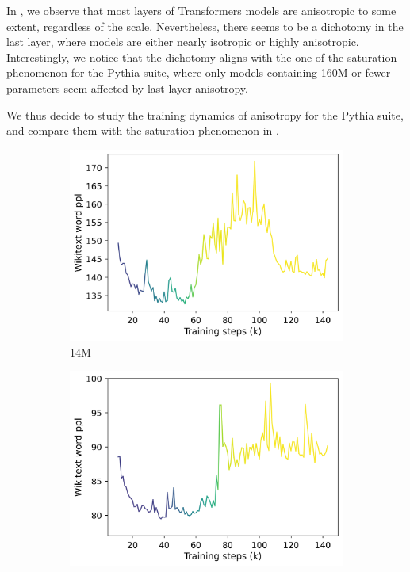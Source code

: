In , we observe that most layers of Transformers models are anisotropic to some extent, regardless of the scale. Nevertheless, there seems to be a dichotomy in the last layer, where models are either nearly isotropic or highly anisotropic. Interestingly, we notice that the dichotomy aligns with the one of the saturation phenomenon for the Pythia suite, where only models containing 160M or fewer parameters seem affected by last-layer anisotropy.

We thus decide to study the training dynamics of anisotropy for the Pythia suite, and compare them with the saturation phenomenon in .

\begin{figure}[h]
    \centering
    \begin{subfigure}{0.32\columnwidth}
         \includegraphics[width=\linewidth]{sources/part_1/softmax_bottleneck/imgs/anisotropy_explosion_14m.png}
         \caption{14M}
         \label{fig:14M}
    \end{subfigure}
    \begin{subfigure}{0.32\columnwidth}
         \includegraphics[width=\linewidth]{sources/part_1/softmax_bottleneck/imgs/anisotropy_explosion_31m.png}

\end{subfigure}
\end{figure}
